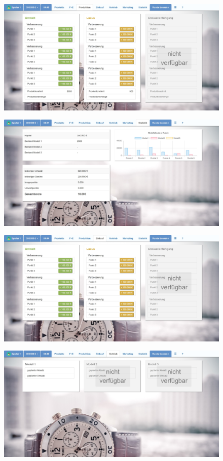 \begin{figure} 
	\centering
	\includegraphics[scale=0.1]{img/bilder_layout/MockUp4.jpg} 
\end{figure}
\begin{figure} 
	\centering
	\includegraphics[scale=0.1]{img/bilder_layout/MockUp5.jpg} 
\end{figure}
\begin{figure} 
	\centering
	\includegraphics[scale=0.1]{img/bilder_layout/MockUp6.jpg} 
\end{figure}
\begin{figure} 
	\centering
	\includegraphics[scale=0.1]{img/bilder_layout/MockUp7.jpg} 
\end{figure}
